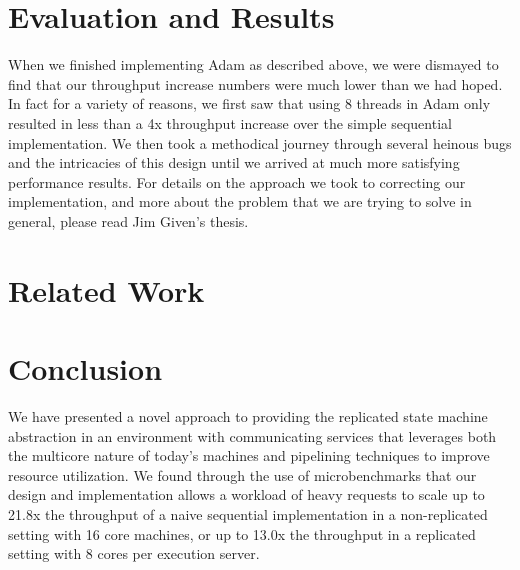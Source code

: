 \documentclass[11pt, oneside]{report}
\begin{document}
\chapter{Evaluation and Results}\label{AdamResults}

When we finished implementing Adam as described above, we were dismayed to find that our throughput increase numbers were much lower than we had hoped. 
In fact for a variety of reasons, we first saw that using 8 threads in Adam only resulted in less than a 4x throughput increase over the simple sequential implementation. 
We then took a methodical journey through several heinous bugs and the intricacies of this design until we arrived at much more satisfying performance results. 
For details on the approach we took to correcting our implementation, and more about the problem that we are trying to solve in general, please read Jim Given's thesis.

\chapter{Related Work}\label{RelatedWork}

\chapter{Conclusion}\label{Conclusion}

We have presented a novel approach to providing the replicated state machine abstraction in an environment with communicating services that leverages both the multicore nature of today's machines and pipelining techniques to improve resource utilization. 
We found through the use of microbenchmarks that our design and implementation allows a workload of heavy requests to scale up to 21.8x the throughput of a naive sequential implementation in a non-replicated setting with 16 core machines, or up to 13.0x the throughput in a replicated setting with 8 cores per execution server.
\end{document}
